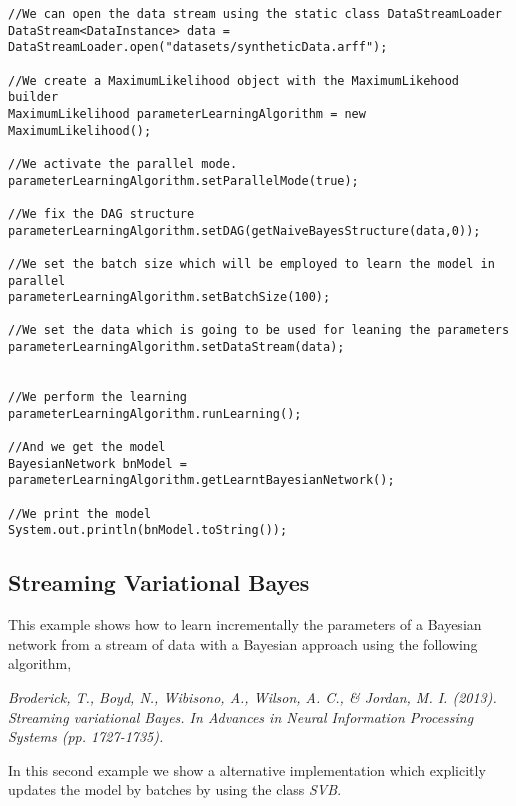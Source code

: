 \begin{lstlisting}
//We can open the data stream using the static class DataStreamLoader
DataStream<DataInstance> data = DataStreamLoader.open("datasets/syntheticData.arff");

//We create a MaximumLikelihood object with the MaximumLikehood builder
MaximumLikelihood parameterLearningAlgorithm = new MaximumLikelihood();

//We activate the parallel mode.
parameterLearningAlgorithm.setParallelMode(true);

//We fix the DAG structure
parameterLearningAlgorithm.setDAG(getNaiveBayesStructure(data,0));

//We set the batch size which will be employed to learn the model in parallel
parameterLearningAlgorithm.setBatchSize(100);

//We set the data which is going to be used for leaning the parameters
parameterLearningAlgorithm.setDataStream(data);


//We perform the learning
parameterLearningAlgorithm.runLearning();

//And we get the model
BayesianNetwork bnModel = parameterLearningAlgorithm.getLearntBayesianNetwork();

//We print the model
System.out.println(bnModel.toString());
\end{lstlisting}



\subsection{Streaming Variational Bayes}

This example shows how to learn incrementally the parameters of a Bayesian network from a stream of data with a Bayesian approach using the following algorithm,

\textit{Broderick, T., Boyd, N., Wibisono, A., Wilson, A. C., \& Jordan, M. I. (2013). Streaming variational Bayes. 
In Advances in Neural Information Processing Systems (pp. 1727-1735).}

In this second example we show a alternative implementation which explicitly updates the model by batches by using the class \textit{SVB}.


